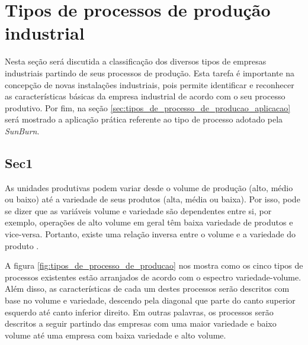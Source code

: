 \chapter{Tipos de processos de produção industrial}
\label{chap:tipos_de_processo_de_producao}

Nesta seção será discutida a classificação dos diversos tipos de empresas industriais partindo de seus processos de produção. Esta tarefa é importante na concepção de novas instalações industriais, pois permite identificar e reconhecer as características básicas da empresa industrial de acordo com o seu processo produtivo. 
Por fim, na seção \ref{sec:tipos_de_processo_de_producao_aplicacao} será mostrado a aplicação prática referente ao tipo de processo adotado pela \textit{SunBurn}.

\section{Sec1}
\label{sec:tipos_de_processo_de_producao_sec1}

As unidades produtivas podem variar desde o volume de produção (alto, médio ou baixo) até a variedade de seus produtos (alta, média ou baixa). Por isso, pode se dizer que as variáveis volume e variedade são dependentes entre si, por exemplo, operações de alto volume em geral têm baixa variedade de produtos e vice-versa. Portanto, existe uma relação inversa entre o volume e a variedade do produto \cite{slack2009administracao}.

A figura \ref{fig:tipos_de_processo_de_producao} nos mostra como os cinco tipos de processos existentes estão arranjados de acordo com o espectro variedade-volume. Além disso, as características de cada um destes processos serão descritos com base no volume e variedade, descendo pela diagonal que parte do canto superior esquerdo até canto inferior direito. Em outras palavras, os processos serão descritos a seguir partindo das empresas com uma maior variedade e baixo volume até uma empresa com baixa variedade e alto volume.

